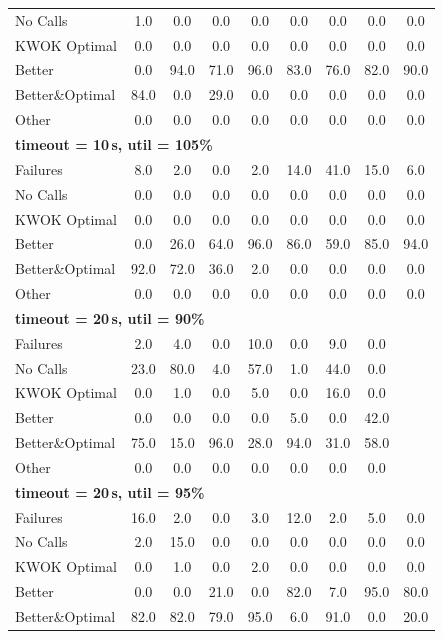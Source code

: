 \begin{tabular}{l cccccccc}
No Calls & 1.0 & 0.0 & 0.0 & 0.0 & 0.0 & 0.0 & 0.0 & 0.0 \\
KWOK Optimal & 0.0 & 0.0 & 0.0 & 0.0 & 0.0 & 0.0 & 0.0 & 0.0 \\
Better & 0.0 & 94.0 & 71.0 & 96.0 & 83.0 & 76.0 & 82.0 & 90.0 \\
Better\&Optimal & 84.0 & 0.0 & 29.0 & 0.0 & 0.0 & 0.0 & 0.0 & 0.0 \\
Other & 0.0 & 0.0 & 0.0 & 0.0 & 0.0 & 0.0 & 0.0 & 0.0 \\
\midrule
\multicolumn{9}{l}{\textbf{timeout = 10\,s, util = 105\%}} \\
\midrule
Failures & 8.0 & 2.0 & 0.0 & 2.0 & 14.0 & 41.0 & 15.0 & 6.0 \\
No Calls & 0.0 & 0.0 & 0.0 & 0.0 & 0.0 & 0.0 & 0.0 & 0.0 \\
KWOK Optimal & 0.0 & 0.0 & 0.0 & 0.0 & 0.0 & 0.0 & 0.0 & 0.0 \\
Better & 0.0 & 26.0 & 64.0 & 96.0 & 86.0 & 59.0 & 85.0 & 94.0 \\
Better\&Optimal & 92.0 & 72.0 & 36.0 & 2.0 & 0.0 & 0.0 & 0.0 & 0.0 \\
Other & 0.0 & 0.0 & 0.0 & 0.0 & 0.0 & 0.0 & 0.0 & 0.0 \\
\midrule
\multicolumn{9}{l}{\textbf{timeout = 20\,s, util = 90\%}} \\
\midrule
Failures & 2.0 & 4.0 & 0.0 & 10.0 & 0.0 & 9.0 & 0.0 & \text{--} \\
No Calls & 23.0 & 80.0 & 4.0 & 57.0 & 1.0 & 44.0 & 0.0 & \text{--} \\
KWOK Optimal & 0.0 & 1.0 & 0.0 & 5.0 & 0.0 & 16.0 & 0.0 & \text{--} \\
Better & 0.0 & 0.0 & 0.0 & 0.0 & 5.0 & 0.0 & 42.0 & \text{--} \\
Better\&Optimal & 75.0 & 15.0 & 96.0 & 28.0 & 94.0 & 31.0 & 58.0 & \text{--} \\
Other & 0.0 & 0.0 & 0.0 & 0.0 & 0.0 & 0.0 & 0.0 & \text{--} \\
\midrule
\multicolumn{9}{l}{\textbf{timeout = 20\,s, util = 95\%}} \\
\midrule
Failures & 16.0 & 2.0 & 0.0 & 3.0 & 12.0 & 2.0 & 5.0 & 0.0 \\
No Calls & 2.0 & 15.0 & 0.0 & 0.0 & 0.0 & 0.0 & 0.0 & 0.0 \\
KWOK Optimal & 0.0 & 1.0 & 0.0 & 2.0 & 0.0 & 0.0 & 0.0 & 0.0 \\
Better & 0.0 & 0.0 & 21.0 & 0.0 & 82.0 & 7.0 & 95.0 & 80.0 \\
Better\&Optimal & 82.0 & 82.0 & 79.0 & 95.0 & 6.0 & 91.0 & 0.0 & 20.0 \\

\end{tabular}
